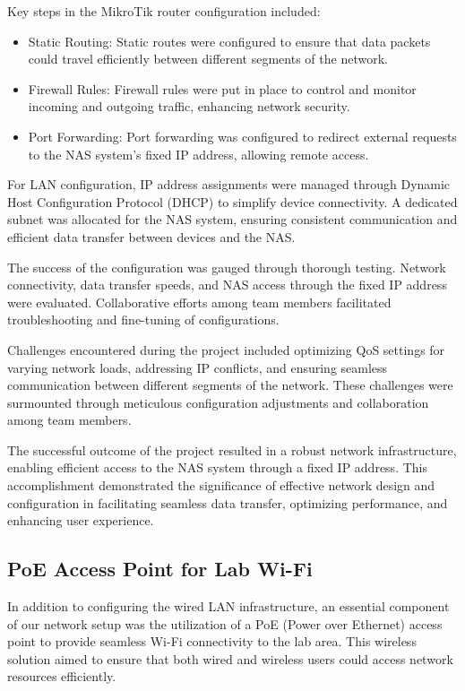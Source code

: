Key steps in the MikroTik router configuration included:

\begin{itemize}
    \item Static Routing: Static routes were configured to ensure that data packets could travel efficiently between different segments of the network.
    
    \item Firewall Rules: Firewall rules were put in place to control and monitor incoming and outgoing traffic, enhancing network security.
    
    \item Port Forwarding: Port forwarding was configured to redirect external requests to the NAS system's fixed IP address, allowing remote access.
\end{itemize}

For LAN configuration, IP address assignments were managed through Dynamic Host Configuration Protocol (DHCP) to simplify device connectivity. A dedicated subnet was allocated for the NAS system, ensuring consistent communication and efficient data transfer between devices and the NAS.

The success of the configuration was gauged through thorough testing. Network connectivity, data transfer speeds, and NAS access through the fixed IP address were evaluated. Collaborative efforts among team members facilitated troubleshooting and fine-tuning of configurations.

Challenges encountered during the project included optimizing QoS settings for varying network loads, addressing IP conflicts, and ensuring seamless communication between different segments of the network. These challenges were surmounted through meticulous configuration adjustments and collaboration among team members.

The successful outcome of the project resulted in a robust network infrastructure, enabling efficient access to the NAS system through a fixed IP address. This accomplishment demonstrated the significance of effective network design and configuration in facilitating seamless data transfer, optimizing performance, and enhancing user experience.

\subsection{PoE Access Point for Lab Wi-Fi}

In addition to configuring the wired LAN infrastructure, an essential component of our network setup was the utilization of a PoE (Power over Ethernet) access point to provide seamless Wi-Fi connectivity to the lab area. This wireless solution aimed to ensure that both wired and wireless users could access network resources efficiently.

